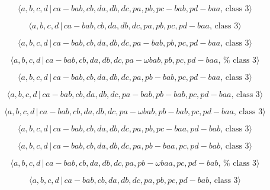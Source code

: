 \documentclass[10pt]{article}
\begin{document}
\begin{equation}
\langle a,b,c,d\,|\,ca-bab,cb,da,db,dc,pa,pb,pc-bab,pd-baa,\,\text{class }%
3\rangle  \tag{7.3326}
\end{equation}

\begin{equation}
\langle a,b,c,d\,|\,ca-bab,cb,da,db,dc,pa,pb,pc,pd-baa,\,\text{class }%
3\rangle  \tag{7.3327}
\end{equation}

\begin{equation}
\langle a,b,c,d\,|\,ca-bab,cb,da,db,dc,pa-bab,pb,pc,pd-baa,\,\text{class }%
3\rangle  \tag{7.3328}
\end{equation}

\begin{equation}
\langle a,b,c,d\,|\,ca-bab,cb,da,db,dc,pa-\omega bab,pb,pc,pd-baa,\,\text{%
class }3\rangle  \tag{7.3329}
\end{equation}

\begin{equation}
\langle a,b,c,d\,|\,ca-bab,cb,da,db,dc,pa,pb-bab,pc,pd-baa,\,\text{class }%
3\rangle  \tag{7.3330}
\end{equation}

\begin{equation}
\langle a,b,c,d\,|\,ca-bab,cb,da,db,dc,pa-bab,pb-bab,pc,pd-baa,\,\text{class 
}3\rangle  \tag{7.3331}
\end{equation}

\begin{equation}
\langle a,b,c,d\,|\,ca-bab,cb,da,db,dc,pa-\omega bab,pb-bab,pc,pd-baa,\,%
\text{class }3\rangle  \tag{7.3332}
\end{equation}

\begin{equation}
\langle a,b,c,d\,|\,ca-bab,cb,da,db,dc,pa,pb,pc-baa,pd-bab,\,\text{class }%
3\rangle  \tag{7.3333}
\end{equation}

\begin{equation}
\langle a,b,c,d\,|\,ca-bab,cb,da,db,dc,pa,pb-baa,pc,pd-bab,\,\text{class }%
3\rangle  \tag{7.3334}
\end{equation}

\begin{equation}
\langle a,b,c,d\,|\,ca-bab,cb,da,db,dc,pa,pb-\omega baa,pc,pd-bab,\,\text{%
class }3\rangle  \tag{7.3335}
\end{equation}

\begin{equation}
\langle a,b,c,d\,|\,ca-bab,cb,da,db,dc,pa,pb,pc,pd-bab,\,\text{class }%
3\rangle  \tag{7.3336}
\end{equation}
\end{document}

